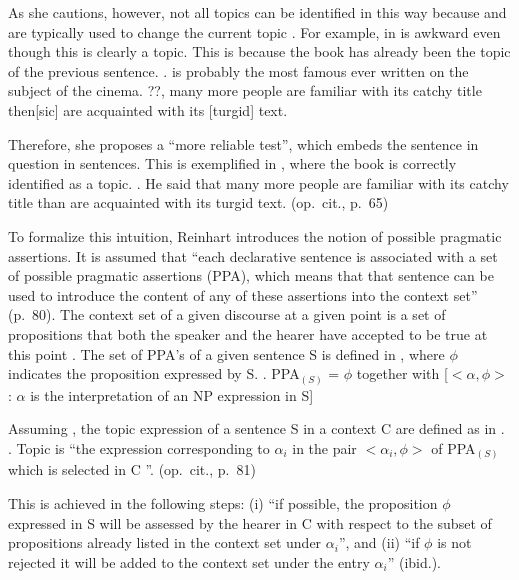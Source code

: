 As she cautions, however,
not all topics can be identified in this way
because  and  are typically used to change the current topic \cite{keenanschieffelin76,durantiochs79}.
For example,  in \Next is awkward even though this is clearly a topic.
This is because the book has already been the topic of the previous sentence.
%
\ex.  is probably the most famous ever written on the subject of the cinema.
 ??, many more people are familiar with its catchy title then[sic] are acquainted with its [turgid] text.
 \hfill{\cite[p.~64]{reinhart81}}

Therefore, she proposes a ``more reliable test'',
which embeds the sentence in question in  sentences.
This is exemplified in \Next,
where the book is correctly identified as a topic.
%
\ex. He said  that many more people are familiar with its catchy title than are acquainted with its turgid text.
  \hfill{(op.~cit., p.~65)}


To formalize this intuition, Reinhart introduces the notion of possible pragmatic assertions.
It is assumed that ``each declarative sentence is associated with a set of possible pragmatic assertions (PPA), which means that that sentence can be used to introduce the content of any of these assertions into the context set'' (p.~80).
The context set of a given discourse at a given point is a set of propositions that both the speaker and the hearer have accepted to be true at this point \cite{stalnaker78}.
The set of PPA's of a given sentence S is defined in \Next,
where $\phi$ indicates the proposition expressed by S.
%
\ex. \label{BackExPPA} PPA$_{(S)}$ = $\phi$ together with [$<\alpha,\phi>$: $\alpha$ is the interpretation of an NP expression in S]
   \hfill{\cite[pp.~80-81]{reinhart81}}

Assuming \Last, the topic expression of a sentence S in a context C
are defined as in \Next.
%
\ex. \label{BackExAboutness} Topic is ``the expression corresponding to $\alpha_{i}$ in the pair $<\alpha_{i},\phi>$ of PPA$_{(S)}$ which is selected in C ''.
    \hfill{(op.~cit., p.~81)}

This is achieved in the following steps:
(i) ``if possible, the proposition $\phi$ expressed in S will be assessed by the hearer in C with respect to the subset of propositions already listed in the context set under $\alpha_{i}$'', and
(ii) ``if $\phi$ is not rejected it will be added to the context set under the entry $\alpha_{i}$'' ({ibid.}).

